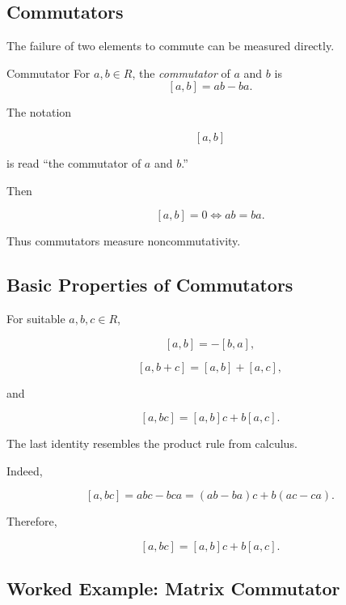 \subsection{Commutators}
\label{subsec:ring-commutators}

The failure of two elements to commute can be measured directly.

\begin{definitionbox}{Commutator}
For \(a,b\in R\), the \emph{commutator} of \(a\) and \(b\) is
\[ [a,b]=ab-ba. \]
\end{definitionbox}

The notation

\[ [a,b] \]

is read ``the commutator of \(a\) and \(b\).''

Then

\[ [a,b]=0\iff ab=ba. \]

Thus commutators measure noncommutativity.

\subsection{Basic Properties of Commutators}
\label{subsec:commutator-properties}

For suitable \(a,b,c\in R\),

\[ [a,b]=-[b,a], \]

\[ [a,b+c]=[a,b]+[a,c], \]

and

\[ [a,bc]=[a,b]c+b[a,c]. \]

The last identity resembles the product rule from calculus.

Indeed,

\[ [a,bc]=abc-bca=(ab-ba)c+b(ac-ca). \]

Therefore,

\[ [a,bc]=[a,b]c+b[a,c]. \]

\subsection{Worked Example: Matrix Commutator}
\label{subsec:worked-matrix-commutator}

